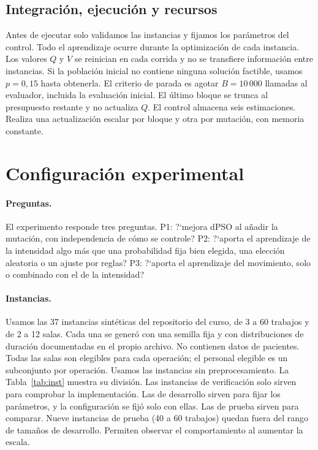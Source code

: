 \documentclass[10pt,a4paper]{article}
\newcommand{\dc}{{,}}%
\begin{document}
\subsection{Integración, ejecución y recursos}

Antes de ejecutar solo validamos las instancias y fijamos los parámetros del control. Todo el
aprendizaje ocurre durante la optimización de cada instancia. Los valores $Q$ y $V$ se
reinician en cada corrida y no se transfiere información entre instancias. Si la población
inicial no contiene ninguna solución factible, usamos $p=0\dc15$ hasta obtenerla. El criterio
de parada es agotar $B=10\,000$ llamadas al evaluador, incluida la evaluación inicial. El último
bloque se trunca al presupuesto restante y no actualiza $Q$. El control almacena seis
estimaciones. Realiza una actualización escalar por bloque y otra por mutación, con memoria
constante.

\section{Configuración experimental}
\label{sec:exp}

\paragraph{Preguntas.}
El experimento responde tres preguntas. P1: ?`mejora dPSO al añadir la mutación, con
independencia de cómo se controle? P2: ?`aporta el aprendizaje de la intensidad algo más que
una probabilidad fija bien elegida, una elección aleatoria o un ajuste por reglas? P3: ?`aporta
el aprendizaje del movimiento, solo o combinado con el de la intensidad?

\paragraph{Instancias.}
Usamos las 37 instancias sintéticas del repositorio del curso, de 3 a 60 trabajos y de 2 a 12
salas. Cada una se generó con una semilla fija y con distribuciones de duración documentadas en
el propio archivo. No contienen datos de pacientes. Todas las salas son elegibles para cada
operación; el personal elegible es un subconjunto por operación. Usamos las instancias sin
preprocesamiento. La Tabla~\ref{tab:inst} muestra su división. Las instancias de verificación
solo sirven para comprobar la implementación. Las de desarrollo sirven para fijar los
parámetros, y la configuración se fijó solo con ellas. Las de prueba sirven para comparar. Nueve
instancias de prueba (40 a 60 trabajos) quedan fuera del rango de tamaños de desarrollo.
Permiten observar el comportamiento al aumentar la escala.
\end{document}
